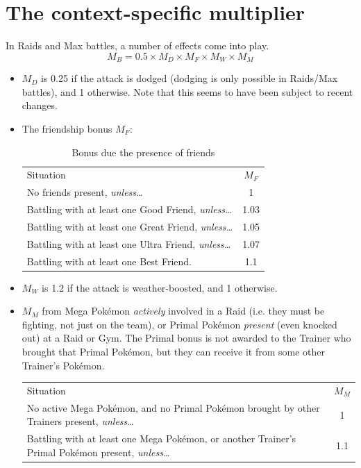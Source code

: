 \section{The context-specific multiplier\label{sec:mbmult}}
In Raids and Max battles, a number of effects come into play.
\[ M_B = 0.5 \times M_D \times M_F \times M_W \times M_M \]
\begin{itemize}
 \item $M_D$ is 0.25 if the attack is dodged (dodging is only possible in Raids/Max battles),
 and 1 otherwise. Note that this seems to have been subject to recent changes.
 \item The friendship bonus $M_F$:
   \begin{table}[h!]
\centering
       \begin{tabular}{lc}
         Situation & $M_F$ \\
         \Midrule
         No friends present, \textit{unless…} & 1 \\
         Battling with at least one Good Friend, \textit{unless…} & 1.03 \\
         Battling with at least one Great Friend, \textit{unless…}  & 1.05 \\
         Battling with at least one Ultra Friend, \textit{unless…} & 1.07 \\
         Battling with at least one Best Friend. & 1.1
       \end{tabular}
     \caption{Bonus due the presence of friends}
   \end{table}
 \item $M_W$ is 1.2 if the attack is weather-boosted, and 1 otherwise.
 \item $M_M$ from Mega Pokémon \textit{actively} involved in a Raid (i.e. they
   must be fighting, not just on the team), or Primal Pokémon \textit{present}
   (even knocked out) at a Raid or Gym. The Primal bonus is not awarded to the Trainer who brought
   that Primal Pokémon, but they can receive it from some other Trainer's Pokémon.
   \begin{table}[h!]
     \centering
       \begin{tabular}{p{}c}
         Situation & $M_M$ \\
         \Midrule
         No active Mega Pokémon, and no Primal Pokémon brought
          by other Trainers present, \textit{unless…} & 1 \\
         Battling with at least one Mega Pokémon,
          or another Trainer's Primal Pokémon present, \textit{unless…} & 1.1 \\

\end{tabular}
\end{table}
\end{itemize}
